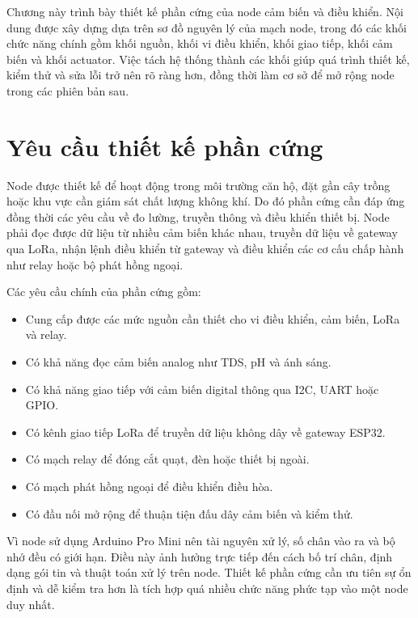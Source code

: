 Chương này trình bày thiết kế phần cứng của node cảm biến và điều khiển. Nội dung được xây dựng dựa trên sơ đồ nguyên lý của mạch node, trong đó các khối chức năng chính gồm khối nguồn, khối vi điều khiển, khối giao tiếp, khối cảm biến và khối actuator. Việc tách hệ thống thành các khối giúp quá trình thiết kế, kiểm thử và sửa lỗi trở nên rõ ràng hơn, đồng thời làm cơ sở để mở rộng node trong các phiên bản sau.

\section{Yêu cầu thiết kế phần cứng}
Node được thiết kế để hoạt động trong môi trường căn hộ, đặt gần cây trồng hoặc khu vực cần giám sát chất lượng không khí. Do đó phần cứng cần đáp ứng đồng thời các yêu cầu về đo lường, truyền thông và điều khiển thiết bị. Node phải đọc được dữ liệu từ nhiều cảm biến khác nhau, truyền dữ liệu về gateway qua LoRa, nhận lệnh điều khiển từ gateway và điều khiển các cơ cấu chấp hành như relay hoặc bộ phát hồng ngoại.

Các yêu cầu chính của phần cứng gồm:
\begin{itemize}
    \item Cung cấp được các mức nguồn cần thiết cho vi điều khiển, cảm biến, LoRa và relay.
    \item Có khả năng đọc cảm biến analog như TDS, pH và ánh sáng.
    \item Có khả năng giao tiếp với cảm biến digital thông qua I2C, UART hoặc GPIO.
    \item Có kênh giao tiếp LoRa để truyền dữ liệu không dây về gateway ESP32.
    \item Có mạch relay để đóng cắt quạt, đèn hoặc thiết bị ngoài.
    \item Có mạch phát hồng ngoại để điều khiển điều hòa.
    \item Có đầu nối mở rộng để thuận tiện đấu dây cảm biến và kiểm thử.
\end{itemize}

Vì node sử dụng Arduino Pro Mini nên tài nguyên xử lý, số chân vào ra và bộ nhớ đều có giới hạn. Điều này ảnh hưởng trực tiếp đến cách bố trí chân, định dạng gói tin và thuật toán xử lý trên node. Thiết kế phần cứng cần ưu tiên sự ổn định và dễ kiểm tra hơn là tích hợp quá nhiều chức năng phức tạp vào một node duy nhất.

